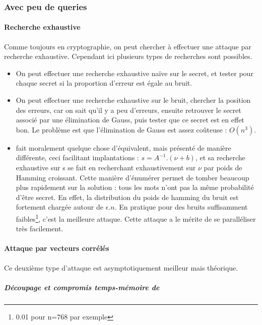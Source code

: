 \documentclass{article}		%
\theoremstyle{definition}
\theoremstyle{plain}
\theoremstyle{plain}
\theoremstyle{plain}
\theoremstyle{plain}
\begin{document}
\subsubsection{Avec peu de queries}
\paragraph{Recherche exhaustive}
Comme toujours en cryptographie, on peut chercher à effectuer une attaque
par recherche exhaustive. Cependant ici plusieurs types de recherches sont
possibles.
\begin{itemize}
\item On peut effectuer une recherche exhaustive naïve sur le
secret, et tester pour chaque secret si la proportion d'erreur est égale
au bruit.
\item On peut effectuer une recherche exhaustive sur le bruit, chercher
la position des erreurs, car on sait qu'il y a peu d'erreurs, ensuite
retrouver le secret associé par une élimination de Gauss, puis tester que
ce secret est en effet bon. Le problème est que l'élimination de Gauss
est assez coûteuse : $O(n^3)$.
\item \cite{Gol} fait moralement quelque chose d'équivalent, mais
présenté de manière différente, ceci facilitant implantations :
$s=A^{-1}.(\nu+b)$, et sa recherche
exhaustive sur s se fait en recherchant exhaustivement sur $\nu$ par poids
de Hamming croissant. Cette manière d'énumérer permet de tomber beaucoup
plus rapidement sur la solution : tous les mots n'ont pas la même
probabilité d'être secret. En effet, la distribution du poids de
hamming du bruit est fortement chargée autour de $\epsilon.n$. En pratique pour des bruits suffisamment
faibles\footnote{0.01 pour n=768 par exemple}, c'est la meilleure attaque. Cette attaque a
le mérite de se paralléliser très facilement. 
\end{itemize} 

\paragraph{Attaque par vecteurs corrélés}
Ce deuxième type d'attaque est asymptotiquement meilleur mais théorique.
\subparagraph{Découpage et compromis temps-mémoire de \cite{Grigo}}
\end{document}
